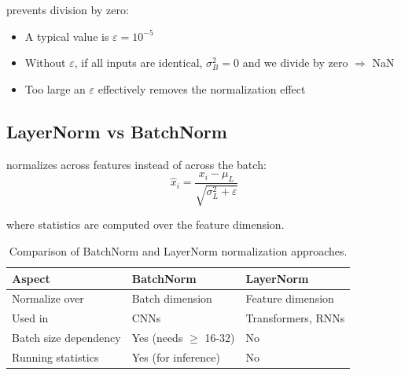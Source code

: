  prevents division by zero:
\begin{itemize}
    \item A typical value is $\varepsilon = 10^{-5}$
    \item Without $\varepsilon$, if all inputs are identical, $\sigma_B^2 = 0$ and we divide by zero $\Rightarrow$ NaN
    \item Too large an $\varepsilon$ effectively removes the normalization effect
\end{itemize}



\subsection{LayerNorm vs BatchNorm}

 normalizes across features instead of across the batch:
\begin{equation}
    \hat{x}_i = \frac{x_i - \mu_L}{\sqrt{\sigma_L^2 + \varepsilon}}
\end{equation}

where statistics are computed over the feature dimension.

\vspace{2em}
\begin{table}[ht]
\centering
\begin{tabular}{p{}p{}p{}}
\toprule
\textbf{Aspect} & \textbf{BatchNorm} & \textbf{LayerNorm} \\
\midrule
Normalize over & Batch dimension & Feature dimension \\
Used in & CNNs & Transformers, RNNs \\
Batch size dependency & Yes (needs $\geq$ 16-32) & No \\
Running statistics & Yes (for inference) & No \\
\bottomrule
\end{tabular}
\vspace{2em}
\caption{Comparison of BatchNorm and LayerNorm normalization approaches.}
\label{tab:batchnorm_layernorm}
\end{table}




